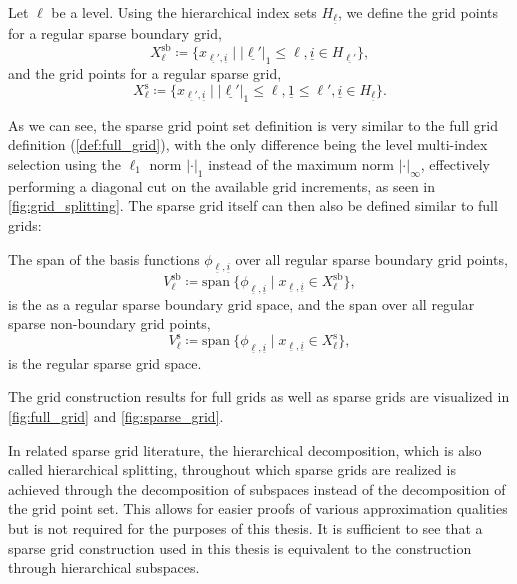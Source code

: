 \documentclass[
  a4paper,  %
  twoside,  %
  bibliography=totoc,
  headsepline,
  cleardoublepage=empty,
  parskip=half,
  draft=false
]{scrbook}
\begin{document}
\begin{definition}
Let $\ell$ be a level. Using the hierarchical index sets $H_{\underline{\ell}}$, we define the grid points for a regular sparse boundary grid,
\begin{equation}
X^{\mathrm{sb}}_{\ell} \coloneqq \{x_{\underline{\ell'},\underline{i}} \mid |\underline{\ell'}|_1 \leq \ell, \underline{i} \in H_{\underline{\ell'}}\},
\end{equation}
and the grid points for a regular sparse grid,
\begin{equation}
X^{\mathrm{s}}_{\ell} \coloneqq \{x_{\underline{\ell'},\underline{i}} \mid |\underline{\ell'}|_1 \leq \ell, \underline{1} \leq \ell', \underline{i} \in H_{\underline{\ell}}\}.
\end{equation}
\end{definition}
%
As we can see, the sparse grid point set definition is very similar to the full grid definition (\cref{def:full_grid}), with the only difference being the level multi-index selection using the $\ell_1$ norm ${|\cdot|}_1$ instead of the maximum norm $|\cdot|_\infty$, effectively performing a diagonal cut on the available grid increments, as seen in \cref{fig:grid_splitting}.
The sparse grid itself can then also be defined similar to full grids:
\begin{definition}
The span of the basis functions $\phi_{\underline{\ell},\underline{i}}$ over all regular sparse boundary grid points,
\begin{equation}
V^{\mathrm{sb}}_{\ell} \coloneqq \mathrm{span}~ \{\phi_{\underline{\ell},\underline{i}} \mid x_{\underline{\ell},\underline{i}} \in X^{\mathrm{sb}}_{\ell}\},
\end{equation}
is the as a regular sparse boundary grid space, and the span over all regular sparse non-boundary grid points,
\begin{equation}
V^{\mathrm{s}}_{\ell} \coloneqq \mathrm{span}~ \{\phi_{\underline{\ell},\underline{i}} \mid x_{\underline{\ell},\underline{i}} \in X^{\mathrm{s}}_{\ell}\},
\label{eq:sparse_grid}
\end{equation}
is the regular sparse grid space.
\label{def:sparse_grid}
\end{definition}
%
The grid construction results for full grids as well as sparse grids are visualized in \cref{fig:full_grid} and \cref{fig:sparse_grid}.

In related sparse grid literature, the hierarchical decomposition, which is also called hierarchical splitting, throughout which sparse grids are realized is achieved through the decomposition of subspaces instead of the decomposition of the grid point set.
This allows for easier proofs of various approximation qualities but is not required for the purposes of this thesis.
It is sufficient to see that a sparse grid construction used in this thesis is equivalent to the construction through hierarchical subspaces.
\end{document}
